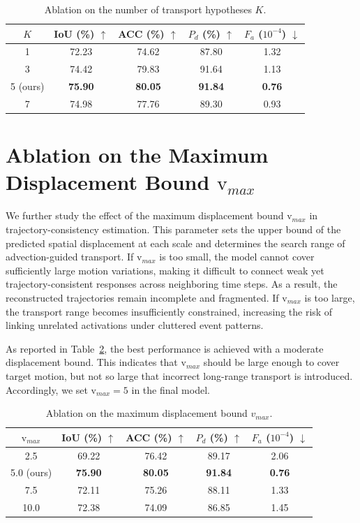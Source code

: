 \documentclass[runningheads]{llncs}
\begin{document}
\begin{table}[t]
\centering
\caption{Ablation on the number of transport hypotheses $K$.}
\label{tab:ablation_k}
\small
\setlength{\tabcolsep}{6pt}
\renewcommand{\arraystretch}{1.1}
\begin{tabular}{ccccc}
\toprule
$K$ & IoU (\%) $\uparrow$ & ACC (\%) $\uparrow$ & $P_d$ (\%) $\uparrow$ & $F_a$ ($10^{-4}$) $\downarrow$ \\
\midrule
1 & 72.23 & 74.62 & 87.80 & 1.32 \\
3 & 74.42 & 79.83 & 91.64 & 1.13 \\
5 (ours) & \textbf{75.90} & \textbf{80.05} & \textbf{91.84} & \textbf{0.76} \\
7 & 74.98 & 77.76 & 89.30 & 0.93 \\
\bottomrule
\end{tabular}
\end{table}

\section{Ablation on the Maximum Displacement Bound $\mathrm{v}_{max}$}
We further study the effect of the maximum displacement bound $\mathrm{v}_{max}$ in trajectory-consistency estimation. 
This parameter sets the upper bound of the predicted spatial displacement at each scale and determines the search range of advection-guided transport. 
If $\mathrm{v}_{max}$ is too small, the model cannot cover sufficiently large motion variations, making it difficult to connect weak yet trajectory-consistent responses across neighboring time steps. 
As a result, the reconstructed trajectories remain incomplete and fragmented. 
If $\mathrm{v}_{max}$ is too large, the transport range becomes insufficiently constrained, increasing the risk of linking unrelated activations under cluttered event patterns.

As reported in Table~\ref{tab:ablation_vmax}, the best performance is achieved with a moderate displacement bound. 
This indicates that $\mathrm{v}_{max}$ should be large enough to cover target motion, but not so large that incorrect long-range transport is introduced. 
Accordingly, we set $\mathrm{v}_{max}=5$ in the final model.

\begin{table}[t]
\centering
\caption{Ablation on the maximum displacement bound $v_{max}$.}
\label{tab:ablation_vmax}
\small
\setlength{\tabcolsep}{6pt}
\renewcommand{\arraystretch}{1.1}
\begin{tabular}{ccccc}
\toprule
$\mathrm{v}_{max}$ & IoU (\%) $\uparrow$ & ACC (\%) $\uparrow$ & $P_d$ (\%) $\uparrow$ & $F_a$ ($10^{-4}$) $\downarrow$ \\
\midrule
2.5 & 69.22 & 76.42 & 89.17 & 2.06 \\
5.0 (ours) & \textbf{75.90} & \textbf{80.05} & \textbf{91.84} & \textbf{0.76} \\
7.5 & 72.11 & 75.26 & 88.11 & 1.33 \\
10.0 & 72.38 & 74.09 & 86.85 & 1.45 \\
\bottomrule
\end{tabular}
\end{table}
\end{document}
